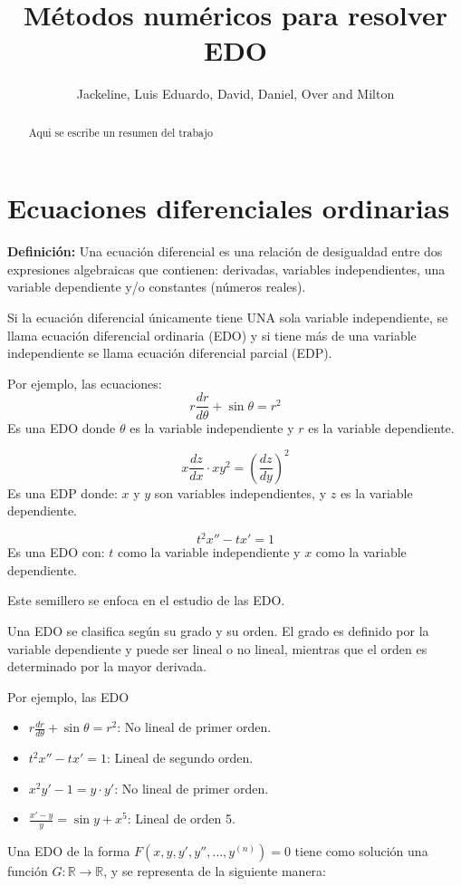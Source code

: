 \documentclass[12pt,letterpaper]{article}
\title{Métodos numéricos para resolver EDO}
\author{Jackeline, Luis Eduardo, David, Daniel, Over and Milton}
\date{}
\begin{document}
\maketitle
\begin{abstract}
 Aqui se escribe un resumen del trabajo  
\end{abstract}

\section{Ecuaciones diferenciales ordinarias}
\textbf{Definición:} Una ecuación diferencial es una relación de desigualdad entre dos expresiones algebraicas que contienen: derivadas, variables independientes, una variable dependiente y/o constantes (números reales).

Si la ecuación diferencial únicamente tiene UNA sola variable independiente, se llama ecuación diferencial ordinaria (EDO) y si tiene más de una variable independiente se llama ecuación diferencial parcial (EDP).

Por ejemplo, las ecuaciones:
\[ r \frac{dr}{d\theta} + \sin \theta = r^2 \]Es una EDO donde $\theta$ es la variable independiente y $r$ es la variable dependiente.

\[x \frac{dz}{dx} \cdot xy^2 = \left(\frac{dz}{dy}\right)^2\]
Es una EDP donde: $x$ y $y$ son variables independientes, y $z$ es la variable dependiente.

\[t^2 x'' - tx' = 1\]
Es una EDO con: $t$ como la variable independiente y $x$ como la variable dependiente.

Este semillero se enfoca en el estudio de las EDO.

Una EDO se clasifica según su grado y su orden. El grado es definido por la variable dependiente y puede ser lineal o no lineal, mientras que el orden es determinado por la mayor derivada.

Por ejemplo, las EDO

\begin{itemize}
  \item $r \frac{dr}{d\theta} + \sin\theta = r^2$: No lineal de primer orden.
  \item $t^2 x'' - tx' = 1$: Lineal de segundo orden.
  \item $x^2 y' - 1 = y \cdot y'$: No lineal de primer orden.
  \item $\frac{x' - y}{y} = \sin y + x^5$: Lineal de orden 5.
\end{itemize}

Una EDO de la forma $F(x, y, y', y'', \ldots, y^{(n)}) = 0$ tiene como solución una función $G: \mathbb{R} \rightarrow \mathbb{R}$, y se representa de la siguiente manera:
\end{document}
